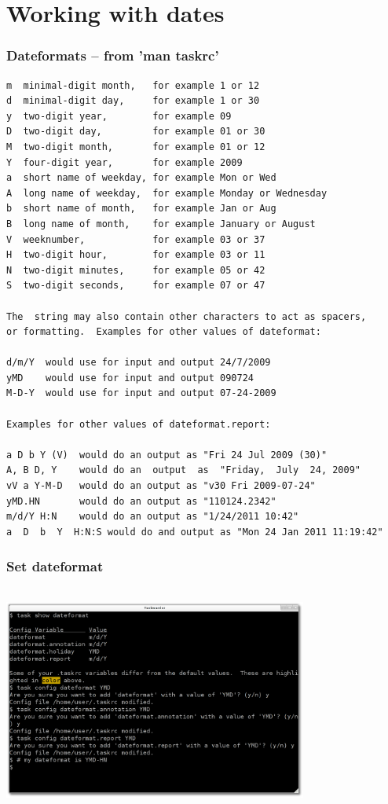 \documentclass[t,handout]{beamer}
\begin{document}
\section{Working with dates}

\begin{frame}[fragile]
\frametitle{Dateformats -- from 'man taskrc'}
\begin{lstlisting}
m  minimal-digit month,   for example 1 or 12
d  minimal-digit day,     for example 1 or 30
y  two-digit year,        for example 09
D  two-digit day,         for example 01 or 30
M  two-digit month,       for example 01 or 12
Y  four-digit year,       for example 2009
a  short name of weekday, for example Mon or Wed
A  long name of weekday,  for example Monday or Wednesday
b  short name of month,   for example Jan or Aug
B  long name of month,    for example January or August
V  weeknumber,            for example 03 or 37
H  two-digit hour,        for example 03 or 11
N  two-digit minutes,     for example 05 or 42
S  two-digit seconds,     for example 07 or 47

The  string may also contain other characters to act as spacers,
or formatting.  Examples for other values of dateformat:

d/m/Y  would use for input and output 24/7/2009
yMD    would use for input and output 090724
M-D-Y  would use for input and output 07-24-2009

Examples for other values of dateformat.report:

a D b Y (V)  would do an output as "Fri 24 Jul 2009 (30)"
A, B D, Y    would do an  output  as  "Friday,  July  24, 2009"
vV a Y-M-D   would do an output as "v30 Fri 2009-07-24"
yMD.HN       would do an output as "110124.2342"
m/d/Y H:N    would do an output as "1/24/2011 10:42"
a  D  b  Y  H:N:S would do and output as "Mon 24 Jan 2011 11:19:42"
\end{lstlisting}
\end{frame}

\begin{frame}
\frametitle{Set dateformat}
\begin{center}
\includegraphics[width=10cm,height=7.5cm]{set_dateformat.png}
\end{center}
\end{frame}
\end{document}
